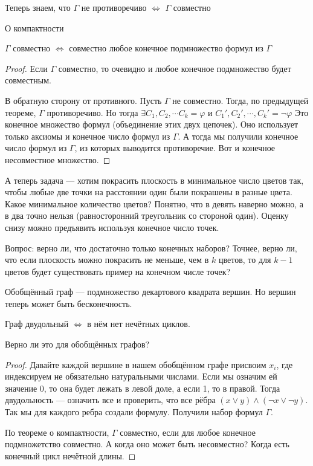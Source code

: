 Теперь знаем, что $\Gamma$ не противоречиво $\Leftrightarrow$ $\Gamma$ совместно

\begin{theorem} О компактности

	$\Gamma$ совместно $\Leftrightarrow$ совместно любое конечное подмножество формул из $\Gamma$
	
\end{theorem}
\begin{proof}
	Если $\Gamma$ совместно, то очевидно и любое конечное подмножество будет совместным.

	В обратную сторону от противного. Пусть $\Gamma$ не совместно. Тогда, по предыдущей теореме, $\Gamma$ противоречиво. Но тогда $\exists C_1, C_2, \cdots C_k = \varphi$ и $C_1', C_2', \cdots, C_k' = \lnot \varphi$
	Это конечное множество формул (объединение этих двух цепочек). Оно использует только аксиомы и конечное число формул из $\Gamma$. А тогда мы получили конечное число формул из $\Gamma$, из которых выводится противоречие. Вот и конечное несовместное множество.
\end{proof}

А теперь задача --- хотим покрасить плоскость в минимальное число цветов так, чтобы любые две точки на расстоянии один были покрашены в разные цвета. Какое минимальное количество цветов? Понятно, что в девять наверно можно, а в два точно нельзя (равносторонний треугольник со стороной один). Оценку снизу можно предъявить используя конечное число точек. 

Вопрос: верно ли, что достаточно только конечных наборов? Точнее, верно ли, что если плоскость можно покрасить не меньше, чем в $k$ цветов, то для $k-1$ цветов будет существовать пример на конечном числе точек?

\begin{definition}
	Обобщённый граф --- подмножество декартового квадрата вершин. Но вершин теперь может быть бесконечность.
\end{definition}
\begin{definition}
	Граф двудольный $\Leftrightarrow$ в нём нет нечётных циклов. 
\end{definition}

\begin{theorem}
Верно ли это для обобщённых графов? 
\end{theorem}
\begin{proof}
Давайте каждой вершине в нашем обобщённом графе присвоим $x_i$, где индексируем не обязательно натуральными числами. Если мы означим ей значение 0, то она будет лежать в левой доле, а если 1, то в правой. Тогда двудольность --- означить все и проверить, что все рёбра $(x \lor y) \land (\lnot x \lor \lnot y)$. Так мы для каждого ребра создали формулу. Получили набор формул $\Gamma$.

По теореме о компактности, $\Gamma$ совместно, если для любое конечное подмножетство совместно. А когда оно может быть несовместно? Когда есть конечный цикл нечётной длины.
\end{proof}

